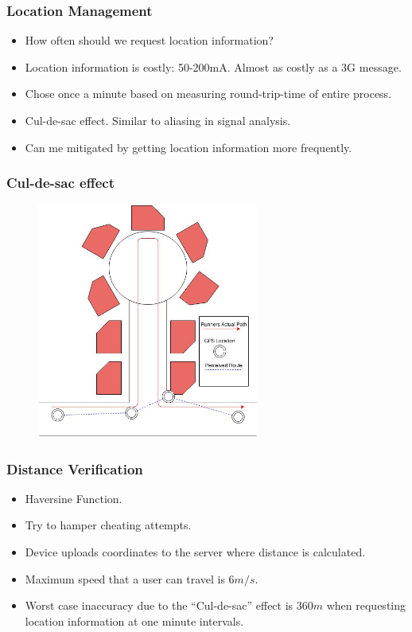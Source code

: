 \documentclass{beamer}
\begin{document}
\begin{frame}
  \frametitle{Location Management}
  \begin{itemize}
    \item How often should we request location information?
    \item Location information is costly: 50-200mA. Almost as costly
      as a 3G message.
    \item Chose once a minute based on measuring round-trip-time of
      entire process.
    \item Cul-de-sac effect. Similar to aliasing in signal analysis.  
    \item Can me mitigated by getting location information more
      frequently. 
  \end{itemize}
\end{frame}

\begin{frame}
  \frametitle{Cul-de-sac effect}
  \begin{figure}[h]
    \centering
    \includegraphics[width=0.65\textwidth]{images/cul-de-sac.jpg}
  \end{figure}
\end{frame}

\begin{frame}
  \frametitle{Distance Verification}
  \begin{itemize}
    \item Haversine Function.
    \item Try to hamper cheating attempts.
    \item Device uploads coordinates to the server where distance is
      calculated. 
    \item Maximum speed that a user can travel is 6$m/s$.
    \item Worst case inaccuracy due to the ``Cul-de-sac'' effect is
      360$m$ when requesting location information at one minute intervals.
  \end{itemize}
\end{frame}
\end{document}
